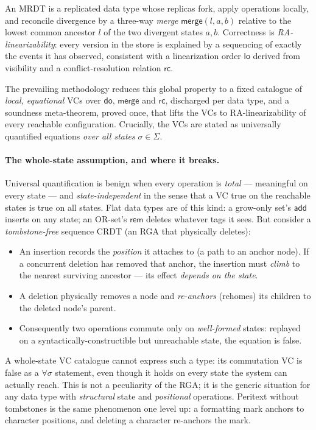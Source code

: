 \documentclass[11pt]{article}
\newcommand{\Merge}{\mathsf{merge}}
\newcommand{\dolab}{\mathsf{do}}
\begin{document}
An MRDT is a replicated data type whose replicas fork, apply operations locally,
and reconcile divergence by a three-way \emph{merge} $\Merge(l,a,b)$ relative to
the lowest common ancestor $l$ of the two divergent states $a,b$. Correctness is
\emph{RA-linearizability}: every version in the store is explained by a
sequencing of exactly the events it has observed, consistent with a
linearization order $\mathsf{lo}$ derived from visibility and a
conflict-resolution relation $\mathsf{rc}$.

The prevailing methodology reduces this global property to a fixed catalogue of
\emph{local, equational} VCs over $\dolab$, $\Merge$ and $\mathsf{rc}$,
discharged per data type, and a soundness meta-theorem, proved once, that lifts
the VCs to RA-linearizability of every reachable configuration. Crucially, the
VCs are stated as universally quantified equations \emph{over all states}
$\sigma \in \Sigma$.

\paragraph{The whole-state assumption, and where it breaks.}
Universal quantification is benign when every operation is \emph{total} ---
meaningful on every state --- and \emph{state-independent} in the sense that a
VC true on the reachable states is true on all states. Flat data types are of
this kind: a grow-only set's $\mathsf{add}$ inserts on any state; an OR-set's
$\mathsf{rem}$ deletes whatever tags it sees. But consider a
\emph{tombstone-free} sequence CRDT (an RGA that physically deletes):

\begin{itemize}[leftmargin=1.4em]
\item An insertion records the \emph{position} it attaches to (a path to an
  anchor node). If a concurrent deletion has removed that anchor, the insertion
  must \emph{climb} to the nearest surviving ancestor --- its effect
  \emph{depends on the state}.
\item A deletion physically removes a node and \emph{re-anchors} (rehomes) its
  children to the deleted node's parent.
\item Consequently two operations commute only on \emph{well-formed} states:
  replayed on a syntactically-constructible but unreachable state, the equation
  is false.
\end{itemize}

A whole-state VC catalogue cannot express such a type: its commutation VC is
false as a $\forall\sigma$ statement, even though it holds on every state the
system can actually reach. This is not a peculiarity of the RGA; it is the
generic situation for any data type with \emph{structural} state and
\emph{positional} operations. Peritext without tombstones is the same
phenomenon one level up: a formatting mark anchors to character positions, and
deleting a character re-anchors the mark.
\end{document}

